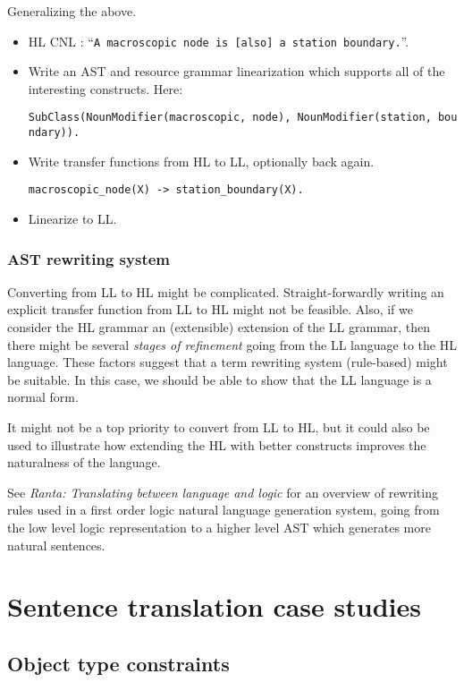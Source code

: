\documentclass[]{article}
\begin{document}
Generalizing the above.

\begin{itemize}
\item
  HL CNL :
  ``\texttt{A\ macroscopic\ node\ is\ {[}also{]}\ a\ station\ boundary.}''.
\item
  Write an AST and resource grammar linearization which supports all of
  the interesting constructs. Here:

  \texttt{SubClass(NounModifier(macroscopic,\ node),\ NounModifier(station,\ boundary)).}
\item
  Write transfer functions from HL to LL, optionally back again.

  \texttt{macroscopic\_node(X)\ -\textgreater{}\ station\_boundary(X).}
\item
  Linearize to LL.
\end{itemize}

\subsubsection{AST rewriting system}\label{ast-rewriting-system}

Converting from LL to HL might be complicated. Straight-forwardly
writing an explicit transfer function from LL to HL might not be
feasible. Also, if we consider the HL grammar an (extensible) extension
of the LL grammar, then there might be several \emph{stages of
refinement} going from the LL language to the HL language. These factors
suggest that a term rewriting system (rule-based) might be suitable. In
this case, we should be able to show that the LL language is a normal
form.

It might not be a top priority to convert from LL to HL, but it could
also be used to illustrate how extending the HL with better constructs
improves the naturalness of the language.

See \emph{Ranta: Translating between language and logic} for an overview
of rewriting rules used in a first order logic natural language
generation system, going from the low level logic representation to a
higher level AST which generates more natural sentences.

\section{Sentence translation case
studies}\label{sentence-translation-case-studies}

\subsection{Object type constraints}\label{object-type-constraints}
\end{document}
